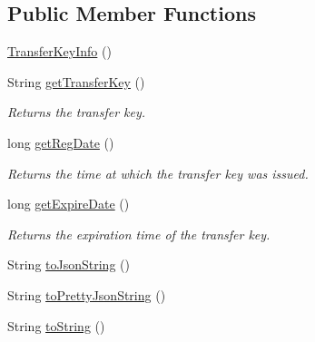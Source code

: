 \subsection*{Public Member Functions}
\begin{DoxyCompactItemize}
\item 
\hyperlink{classcom_1_1toast_1_1android_1_1gamebase_1_1auth_1_1data_1_1_transfer_key_info_a10eef871dc71784168523aeb72754bd2}{Transfer\+Key\+Info} ()
\item 
String \hyperlink{classcom_1_1toast_1_1android_1_1gamebase_1_1auth_1_1data_1_1_transfer_key_info_af2a96639d067b4a9082defc90c303460}{get\+Transfer\+Key} ()
\begin{DoxyCompactList}\small\item\em Returns the transfer key. \end{DoxyCompactList}\item 
long \hyperlink{classcom_1_1toast_1_1android_1_1gamebase_1_1auth_1_1data_1_1_transfer_key_info_a9532e1636d0dfc2bee56231288f3eb43}{get\+Reg\+Date} ()
\begin{DoxyCompactList}\small\item\em Returns the time at which the transfer key was issued. \end{DoxyCompactList}\item 
long \hyperlink{classcom_1_1toast_1_1android_1_1gamebase_1_1auth_1_1data_1_1_transfer_key_info_ae459d266bfc8b663d28ffbf3cd045e97}{get\+Expire\+Date} ()
\begin{DoxyCompactList}\small\item\em Returns the expiration time of the transfer key. \end{DoxyCompactList}\item 
String \hyperlink{classcom_1_1toast_1_1android_1_1gamebase_1_1base_1_1_value_object_a58acf6402880e9769d79d8667581fa6a}{to\+Json\+String} ()
\item 
String \hyperlink{classcom_1_1toast_1_1android_1_1gamebase_1_1base_1_1_value_object_a054431f3d988a22295cfc8b784ff2637}{to\+Pretty\+Json\+String} ()
\item 
String \hyperlink{classcom_1_1toast_1_1android_1_1gamebase_1_1base_1_1_value_object_ad146fa8579a5f8a876c4688cc5a68520}{to\+String} ()
\end{DoxyCompactItemize}
